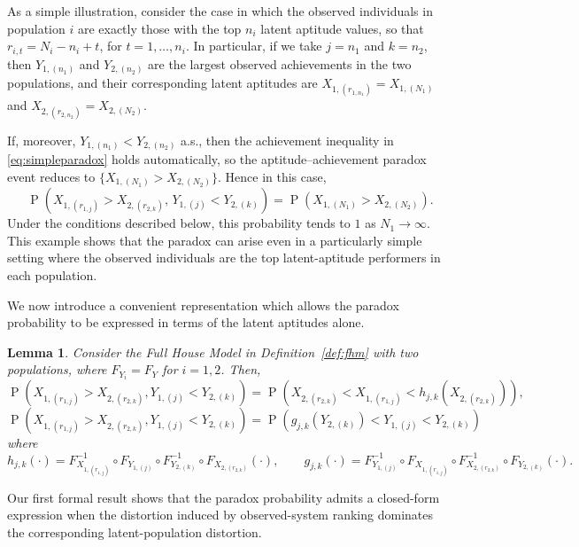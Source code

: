\documentclass[12pt]{article}
\DeclareMathOperator*{\Prob}{P}
\newtheorem{lemma}[theorem]{Lemma}
\begin{document}
As a simple illustration, consider the case in which the observed individuals in population $i$ are exactly those with the top $n_i$ latent aptitude values, so that $r_{i,t}=N_i-n_i+t$, for $t=1,\dots,n_i$. In particular, if we take $j=n_1$ and $k=n_2$, then $Y_{1,(n_1)}$ and $Y_{2,(n_2)}$ are the largest observed achievements in the two populations, and their corresponding latent aptitudes are $X_{1,(r_{1,n_1})}=X_{1,(N_1)}$ and $X_{2,(r_{2,n_2})}=X_{2,(N_2)}$.

If, moreover, $Y_{1,(n_1)}<Y_{2,(n_2)}$ a.s., then the achievement inequality in \eqref{eq:simpleparadox} holds automatically, so the aptitude--achievement paradox event reduces to $\{X_{1,(N_1)} > X_{2,(N_2)}\}$. Hence in this case,
$$
\Prob\left(X_{1,(r_{1,j})} > X_{2,(r_{2,k})},\, Y_{1,(j)} < Y_{2,(k)}\right)
=
\Prob\left(X_{1,(N_1)} > X_{2,(N_2)}\right).
$$
Under the conditions described below, this probability tends to $1$ as $N_1\to\infty$. This example shows that the paradox can arise even in a particularly simple setting where the observed individuals are the top latent-aptitude performers in each population.

We now introduce a convenient representation which allows the paradox probability to be expressed in terms of the latent aptitudes alone.

\begin{lemma} \label{lemma:rep}
Consider the Full House Model in Definition~\ref{def:fhm} with two populations, where $F_{Y_i} = F_{Y}$ for $i=1,2$. Then, 
\begin{equation} \label{eq:pararep}
  \Prob\left(X_{1,(r_{1,j})} > X_{2,(r_{2,k})}, Y_{1,(j)} < Y_{2,(k)}\right) 
  = \Prob\left( X_{2,(r_{2,k})} < X_{1,(r_{1,j})}  < h_{j,k}\left(X_{2,(r_{2,k})}\right)\right),
\end{equation}
\begin{equation} \label{eq:pararep2}
  \Prob\left(X_{1,(r_{1,j})} > X_{2,(r_{2,k})}, Y_{1,(j)} < Y_{2,(k)}\right) 
  = \Prob\left( g_{j,k}\left(Y_{2,(k)}\right) < Y_{1,(j)}  < Y_{2,(k)}\right)
\end{equation}
where 
$$
h_{j,k}(\cdot) = F_{X_{1,(r_{1,j})}}^{-1} \circ F_{Y_{1, (j)}} \circ F_{Y_{2, (k)}}^{-1} \circ F_{X_{2,(r_{2,k})}} (\cdot), \qquad g_{j,k}(\cdot) = F_{Y_{1, (j)}}^{-1} \circ F_{X_{1,(r_{1,j})}} \circ F_{X_{2,(r_{2,k})}}^{-1} \circ F_{Y_{2, (k)}} (\cdot).
$$
\end{lemma}


Our first formal result shows that the paradox probability admits a closed-form expression when the distortion induced by observed-system ranking dominates the corresponding latent-population distortion.
 
\end{document}
